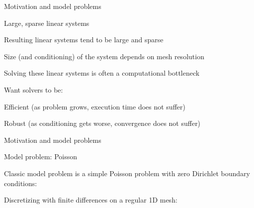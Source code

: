\documentclass[18pt,xcolor=table]{beamer}
\begin{document}
\begin{frame}{Motivation and model problems}
\begin{block}{Large, sparse linear systems}
\bit
\item Resulting linear systems tend to be large and sparse
\item Size (and conditioning) of the system depends on mesh resolution
\item Solving these linear systems is often a computational bottleneck
\item Want solvers to be:
\bit
\item Efficient (as problem grows, execution time does not suffer)
\item Robust (as conditioning gets worse, convergence does not suffer)
\eit
\eit
\end{block}

\end{frame}


\begin{frame}{Motivation and model problems}
\begin{block}{Model problem: Poisson}
\bit
\item Classic model problem is a simple Poisson problem with zero Dirichlet boundary conditions:
\item Discretizing with finite differences on a regular 1D mesh:
\eit
{}
\end{block}

\end{frame}
\end{document}
